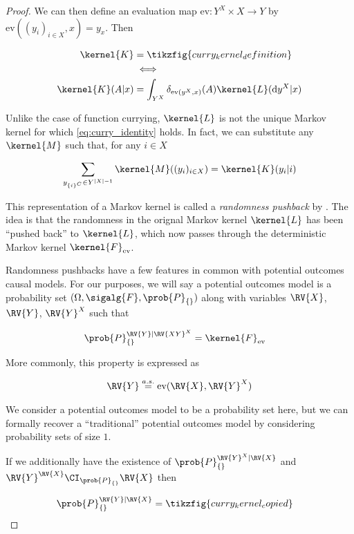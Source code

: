 \begin{proof}
We can then define an evaluation map $\text{ev}:Y^X\times X\to Y$ by $\text{ev}((y_i)_{i\in X},x)=y_x$. Then

\begin{align}
    \kernel{K} &= \tikzfig{curry_kernel_definition} \label{eq:curry_identity}\\
    &\iff\\
    \kernel{K}(A|x) &= \int_{Y^X} \delta_{\text{ev}(y^X,x)}(A) \kernel{L}(\mathrm{d}y^X|x)
\end{align}

Unlike the case of function currying, $\kernel{L}$ is not the unique Markov kernel for which \ref{eq:curry_identity} holds. In fact, we can substitute any $\kernel{M}$ such that, for any $i\in X$

\begin{align}
    \sum_{y_{\{i\}^C}\in Y^{|X|-1}} \kernel{M}((y_i)_{i\in X}) = \kernel{K}(y_i|i)
\end{align}

This representation of a Markov kernel is called a \emph{randomness pushback} by \citet{fritz_synthetic_2020}. The idea is that the randomness in the orignal Markov kernel $\kernel{L}$ has been ``pushed back'' to $\kernel{L}$, which now passes through the deterministic Markov kernel $\kernel{F}_{\mathrm{ev}}$.

Randomness pushbacks have a few features in common with potential outcomes causal models. For our purposes, we will say a potential outcomes model is a probability set $(\Omega,\sigalg{F},\prob{P}_{\{\}})$ along with variables $\RV{X}$, $\RV{Y}$, $\RV{Y}^X$ such that 

\begin{align}
    \prob{P}_{\{\}}^{\RV{Y}|\RV{XY}^X} &= \kernel{F}_{\text{ev}}
\end{align}

More commonly, this property is expressed as

\begin{align}
    \RV{Y}\overset{a.s.}{=}\text{ev}(\RV{X},\RV{Y}^X)
\end{align}

We consider a potential outcomes model to be a probability set here, but we can formally recover a ``traditional'' potential outcomes model by considering probability sets of size $1$.

If we additionally have the existence of $\prob{P}_{\{\}}^{\RV{Y}^X|\RV{X}}$ and $\RV{Y}^\RV{X}\CI_{\prob{P}_{\{\}}} \RV{X}$ then 

\begin{align}
    \prob{P}_{\{\}}^{\RV{Y}|\RV{X}} &= \tikzfig{curry_kernel_copied}\label{eq:curry_identity_po}
\end{align}


\end{proof}
